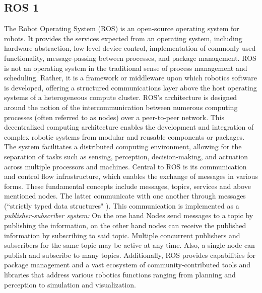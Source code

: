 \documentclass[%
paper=A4,               %
twoside=true,           %
openright,              %
11pt,                   %
bibliography=totoc,     %
titlepage=on,           %
DIV=12,                 %
BCOR=1.5cm,             %
parskip=half,            %
final
]{scrreprt}
\begin{document}
	\subsection{ROS 1}
	The Robot Operating System (ROS) is an open-source operating system for robots. It provides the services expected from an operating system, including hardware abstraction, low-level device control, implementation of commonly-used functionality, message-passing between processes, and package management. ROS is not an operating system in the traditional sense of process management and scheduling. Rather, it is a framework or middleware upon which robotics software is developed, offering a structured communications layer above the host operating systems of a heterogeneous compute cluster. \autocite{quigleyROSOpensourceRobot2009,ros.orgIntroductionROS2024}
	ROS's architecture is designed around the notion of the intercommunication between numerous computing processes (often referred to as nodes) over a peer-to-peer network. This decentralized computing architecture enables the development and integration of complex robotic systems from modular and reusable components or packages. The system facilitates a distributed computing environment, allowing for the separation of tasks such as sensing, perception, decision-making, and actuation across multiple processors and machines. \autocite{quigleyROSOpensourceRobot2009}
	Central to ROS is its communication and control flow infrastructure, which enables the exchange of messages in various forms. These fundamental concepts include messages, topics, services and above mentioned nodes. The latter communicate with one another through messages (``strictly typed data structures" \autocite{quigleyROSOpensourceRobot2009}). This communication is implemented as a \textit{publisher-subscriber system:} On the one hand Nodes send messages to a topic by publishing the information, on the other hand nodes can receive the published information by subscribing to said topic. Multiple concurrent publishers and subscribers for the same topic may be active at any time. Also, a single node can publish and subscribe to many topics. \autocite{quigleyROSOpensourceRobot2009}
	Additionally, ROS provides capabilities for package management and a vast ecosystem of community-contributed tools and libraries that address various robotics functions ranging from planning and perception to simulation and visualization.
	\autocite{quigleyROSOpensourceRobot2009,ros.orgIntroductionROS2024}
	

	\vspace{-0.3cm}
\end{document}
